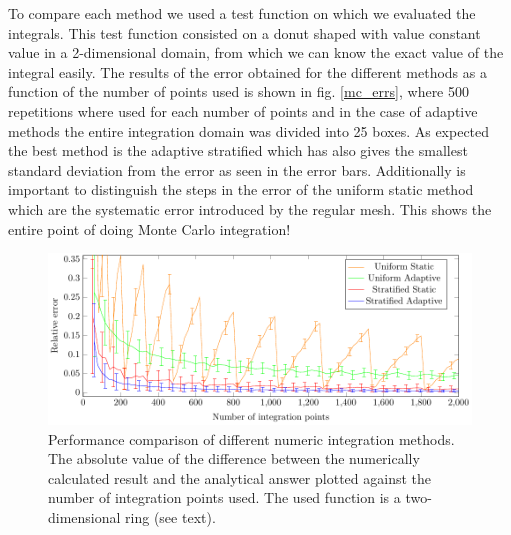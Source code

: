 To compare each method we used a test function on which we evaluated the integrals.
This test function consisted on a donut shaped with value constant value in a 2-dimensional domain, from which
we can know the exact value of the integral easily. The results
of the error obtained for the different methods as a function of the number of points used is shown in fig. \ref{mc_errs},
 where 500 repetitions where used for each number of points and in the case of adaptive methods the entire integration
 domain was divided into 25 boxes. As
expected the best method is the adaptive stratified which has also gives the smallest standard deviation from the error as seen in the error bars.
Additionally is important to distinguish the steps in the error of the uniform static
method which are the systematic error introduced by the regular mesh. This shows the entire point of doing Monte Carlo integration!
\begin{figure}[ht]
  \begin{center}
  \includegraphics[scale=1 ]{graphs/integration_test_ring.pdf}
  \caption{Performance comparison of different numeric integration methods. The absolute value of the difference between the numerically calculated result and the analytical answer plotted against the number of integration points used. The used function is a two-dimensional ring (see text).}
  \label{fig:int}
  \end{center}
\end{figure}
